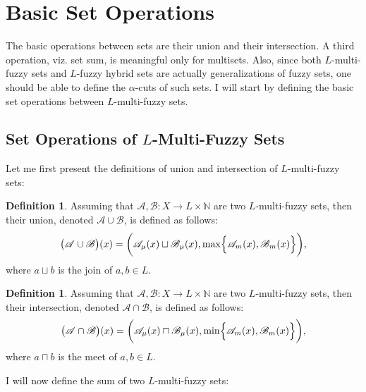 \documentclass{amsart}
\theoremstyle{definition}
\newtheorem{definition}[theorem]{Definition}
\begin{document}
\section{Basic Set Operations}
The basic operations between sets are their union and their intersection. A 
third operation, viz. set sum, is meaningful only for multisets. Also, since 
both $L$-multi-fuzzy sets and $L$-fuzzy hybrid sets are actually 
generalizations of fuzzy sets, one should be able to define the $\alpha$-cuts 
of such sets. I will start by defining the basic set operations between 
$L$-multi-fuzzy sets.

\subsection{Set Operations of $L$-Multi-Fuzzy Sets}
Let me first present the definitions of union and intersection of 
$L$-multi-fuzzy sets:
\begin{definition} Assuming that $\mathscr{A},\mathscr{B}:X\rightarrow L\times
\mathbb{N}$ are two $L$-multi-fuzzy  sets, then their union, denoted 
$\mathscr{A}\cup\mathscr{B}$, is defined as follows:
\begin{displaymath}
\bigl(\mathscr{A}\cup\mathscr{B}\bigr)(x)=\biggl(\mathscr{A}_{\mu}(x)
                                                 \sqcup\mathscr{B}_{\mu}(x),
                                                 \max\Bigl\{\mathscr{A}_{m}(x),
                                                             \mathscr{B}_{m}(x)\Bigr\}
                                           \biggr),
\end{displaymath}
where $a\sqcup b$ is the join of $a,b\in L$.
\end{definition}
\begin{definition} Assuming that $\mathscr{A},\mathscr{B}:X\rightarrow L\times
\mathbb{N}$ are two $L$-multi-fuzzy sets, then their intersection, denoted 
$\mathscr{A}\cap\mathscr{B}$, is defined as follows:
\begin{displaymath}
\bigl(\mathscr{A}\cap\mathscr{B}\bigr)(x)=\biggl(\mathscr{A}_{\mu}(x)
                                                 \sqcap\mathscr{B}_{\mu}(x),
                                                 \min\Bigl\{\mathscr{A}_{m}(x),
                                                             \mathscr{B}_{m}(x)\Bigr\}
                                           \biggr),
\end{displaymath}
where $a\sqcap b$ is the meet of $a,b\in L$.
\end{definition}
I will now define the sum of two $L$-multi-fuzzy sets:
\end{document}
